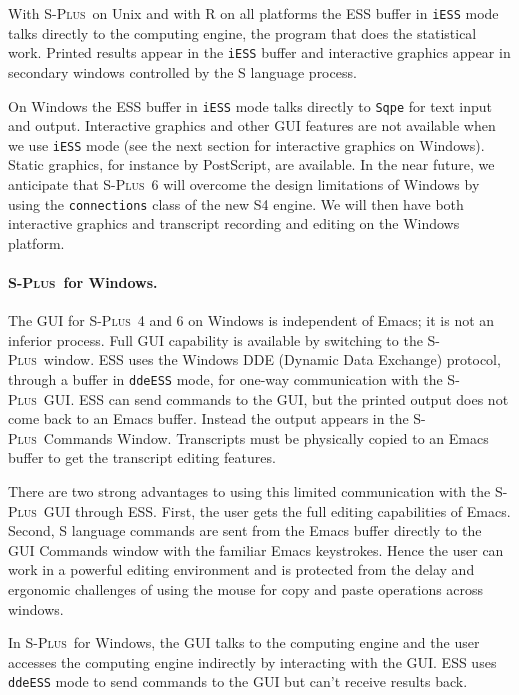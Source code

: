\documentclass{article}
\newcommand*{\Splus}{\textsc{S-Plus}}
\newcommand{\stexttt}[1]{{\small\texttt{#1}}}
\begin{document}
With \Splus\ on Unix and with R on all platforms the ESS buffer in
\stexttt{iESS} mode talks directly to the computing engine, the
program that does the statistical work.  Printed results appear in the
\stexttt{iESS} buffer and interactive graphics appear in secondary
windows controlled by the S language process.

On Windows the ESS buffer in \stexttt{iESS} mode talks directly to
\stexttt{Sqpe} for text input and output.  Interactive graphics and
other GUI features are not available when we use \stexttt{iESS} mode
(see the next section for interactive graphics on Windows).
Static graphics, for instance by PostScript, are available.  In the
near future, we anticipate that \Splus\ 6 will overcome the design
limitations of Windows by using the \stexttt{connections} class of the
new S4 engine.  We will then have both interactive graphics and transcript
recording and editing on the Windows platform.



\paragraph{\Splus\ for Windows.}
The GUI for \Splus\ 4 and 6 on Windows is independent of Emacs; it is not
an inferior process.  Full GUI
capability is available by switching to the \Splus\ window.
ESS uses the Windows DDE (Dynamic Data Exchange) protocol,
through a buffer in \stexttt{ddeESS} mode, for one-way communication with
the \Splus\ GUI.
ESS can send commands to the GUI, but the printed
output does not come back to an Emacs buffer.  Instead the output appears in
the \Splus\ Commands Window.  Transcripts must be physically copied to
an Emacs buffer to get the transcript editing features.

There are two strong advantages to using this limited communication
with the \Splus\ GUI through ESS.  First, the user gets the full
editing capabilities of Emacs.  Second, S language commands are sent
from the Emacs buffer directly to the GUI Commands window with the
familiar Emacs keystrokes.  Hence the user can work in a powerful
editing environment and is protected from the delay and ergonomic
challenges of using the mouse for copy and paste operations across
windows.

In \Splus\ for Windows, the GUI
talks to the computing engine and the user accesses the computing
engine indirectly by interacting with the GUI.  ESS uses
\stexttt{ddeESS} mode to send commands to the GUI but can't receive
results back.
\end{document}
